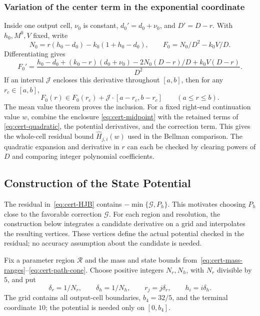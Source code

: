 \documentclass[11pt]{article}
\theoremstyle{definition}
\theoremstyle{remark}
\begin{document}
\subsubsection{Variation of the center term in the exponential coordinate}
Inside one output cell, $\nu_0$ is constant, $d_0'=d_0+\nu_0$, and $D'=D-r$.
With $h_0,M^0,V$ fixed, write
\[
 N_0=r(h_0-d_0)-k_0(1+h_0-d_0),\qquad F_0=N_0/D^2-k_0V/D.
\]
Differentiating gives
\begin{equation}\label{eq:cert-time-derivative}
 F_0'=\frac{h_0-d_0+(k_0-r)(d_0+\nu_0)
                   -2N_0(D-r)/D+k_0V(D-r)}{D^2}.
\end{equation}
If an interval $\mathcal J$ encloses this derivative throughout $[a,b]$, then for any
$r_c\in[a,b]$,
\begin{equation}\label{eq:cert-midpoint}
 F_0(r)\in F_0(r_c)+\mathcal J\cdot[a-r_c,b-r_c]\qquad(a\le r\le b).
\end{equation}
The mean value theorem proves the inclusion.
For a fixed right-end continuation value $w$, combine the enclosure
\eqref{eq:cert-midpoint} with the retained terms of
\eqref{eq:cert-quadratic}, the potential derivatives, and the correction term.  This gives the whole-cell residual bound
$\widehat H_{j,i}(w)$ used in the Bellman comparison.
The quadratic expansion and derivative in $r$ can each be checked by clearing
powers of $D$ and comparing integer polynomial coefficients.

\subsection{Construction of the State Potential}
\label{app:cert-potential-construction}

The residual in~\eqref{eq:cert-HJB} contains
$-\min\{\mathcal G,P_h\}$.  This motivates choosing $P_h$ close to the
favorable correction $\mathcal G$.  For each region and resolution,
the construction below integrates a candidate derivative on a grid and
interpolates the resulting vertices.  These vertices define the actual
potential checked in the residual; no accuracy assumption about the
candidate is needed.

Fix a parameter region $\mathcal R$ and the mass and state bounds
from~\eqref{eq:cert-mass-ranges}--\eqref{eq:cert-path-cone}.
Choose positive integers $N_r,N_h$, with $N_r$ divisible by $5$, and put
\[
 \delta_r=1/N_r,\qquad \delta_h=1/N_h,\qquad
 r_j=j\delta_r,\qquad h_i=i\delta_h.
\]
The grid contains all output-cell boundaries, $b_4=32/5$, and the
terminal coordinate $10$; the potential is needed only on $[0,b_4]$.
\end{document}
